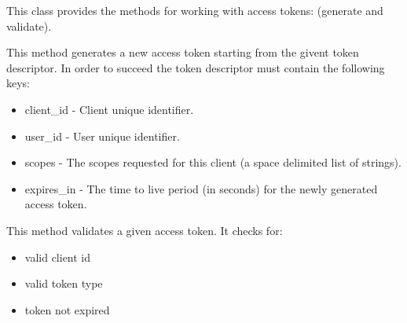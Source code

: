 \documentclass[letterpaper,10pt,english]{sphinxmanual}
\begin{document}

\begin{fulllineitems}
\label{features/oauth2/technical_summary:fantastico.oauth2.accesstoken_generator.AccessTokenGenerator}
This class provides the methods for working with access tokens: (generate and validate).

\begin{fulllineitems}
\label{features/oauth2/technical_summary:fantastico.oauth2.accesstoken_generator.AccessTokenGenerator.generate}
This method generates a new access token starting from the givent token descriptor. In order to succeed the token
descriptor must contain the following keys:
\begin{itemize}
\item {} 
client\_id - Client unique identifier.

\item {} 
user\_id - User unique identifier.

\item {} 
scopes - The scopes requested for this client (a space delimited list of strings).

\item {} 
expires\_in - The time to live period (in seconds) for the newly generated access token.

\end{itemize}

\end{fulllineitems}


\begin{fulllineitems}
\label{features/oauth2/technical_summary:fantastico.oauth2.accesstoken_generator.AccessTokenGenerator.validate}
This method validates a given access token. It checks for:
\begin{itemize}
\item {} 
valid client id

\item {} 
valid token type

\item {} 
token not expired

\end{itemize}

\end{fulllineitems}


\end{fulllineitems}
\end{document}
